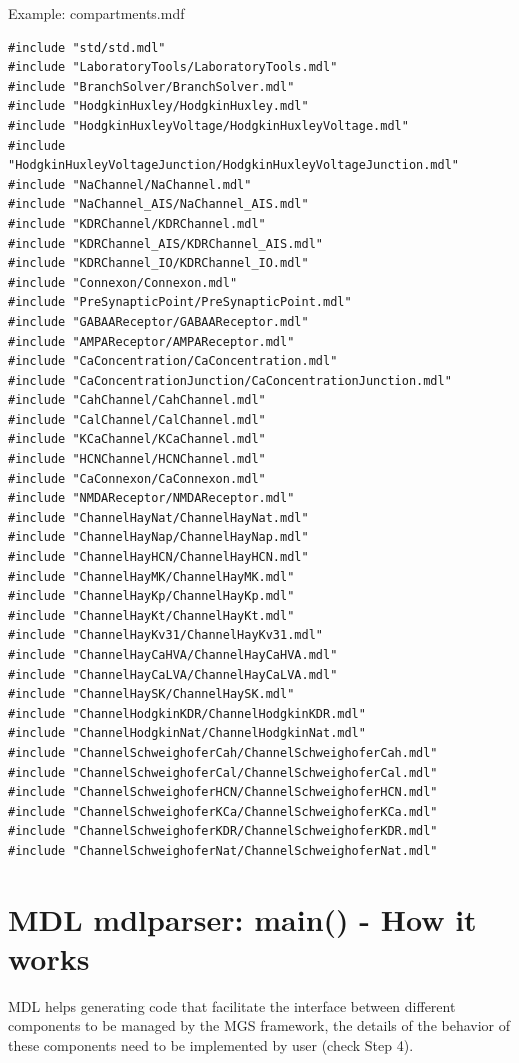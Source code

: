 Example: compartments.mdf
\begin{verbatim}
#include "std/std.mdl"                                                                                                                                                                                 
#include "LaboratoryTools/LaboratoryTools.mdl"
#include "BranchSolver/BranchSolver.mdl"
#include "HodgkinHuxley/HodgkinHuxley.mdl"
#include "HodgkinHuxleyVoltage/HodgkinHuxleyVoltage.mdl"
#include "HodgkinHuxleyVoltageJunction/HodgkinHuxleyVoltageJunction.mdl"
#include "NaChannel/NaChannel.mdl"
#include "NaChannel_AIS/NaChannel_AIS.mdl"
#include "KDRChannel/KDRChannel.mdl"
#include "KDRChannel_AIS/KDRChannel_AIS.mdl"
#include "KDRChannel_IO/KDRChannel_IO.mdl"
#include "Connexon/Connexon.mdl"
#include "PreSynapticPoint/PreSynapticPoint.mdl"
#include "GABAAReceptor/GABAAReceptor.mdl"
#include "AMPAReceptor/AMPAReceptor.mdl"
#include "CaConcentration/CaConcentration.mdl"
#include "CaConcentrationJunction/CaConcentrationJunction.mdl"
#include "CahChannel/CahChannel.mdl"
#include "CalChannel/CalChannel.mdl"
#include "KCaChannel/KCaChannel.mdl"
#include "HCNChannel/HCNChannel.mdl"
#include "CaConnexon/CaConnexon.mdl"
#include "NMDAReceptor/NMDAReceptor.mdl"
#include "ChannelHayNat/ChannelHayNat.mdl"
#include "ChannelHayNap/ChannelHayNap.mdl"
#include "ChannelHayHCN/ChannelHayHCN.mdl"
#include "ChannelHayMK/ChannelHayMK.mdl"
#include "ChannelHayKp/ChannelHayKp.mdl"
#include "ChannelHayKt/ChannelHayKt.mdl"
#include "ChannelHayKv31/ChannelHayKv31.mdl"
#include "ChannelHayCaHVA/ChannelHayCaHVA.mdl"
#include "ChannelHayCaLVA/ChannelHayCaLVA.mdl"
#include "ChannelHaySK/ChannelHaySK.mdl"
#include "ChannelHodgkinKDR/ChannelHodgkinKDR.mdl"
#include "ChannelHodgkinNat/ChannelHodgkinNat.mdl"
#include "ChannelSchweighoferCah/ChannelSchweighoferCah.mdl"
#include "ChannelSchweighoferCal/ChannelSchweighoferCal.mdl"
#include "ChannelSchweighoferHCN/ChannelSchweighoferHCN.mdl"
#include "ChannelSchweighoferKCa/ChannelSchweighoferKCa.mdl"
#include "ChannelSchweighoferKDR/ChannelSchweighoferKDR.mdl"
#include "ChannelSchweighoferNat/ChannelSchweighoferNat.mdl"
\end{verbatim}

\section{MDL mdlparser: main() - How it works}
\label{sec:MDL}
\label{sec:mdlparser}
\label{sec:mdl.tab.c}
\label{sec:Initializer-mdlparser}


MDL helps generating code that facilitate the interface between different
components to be managed by the MGS framework, the details of the behavior of
these components need to be implemented by user (check Step 4).

